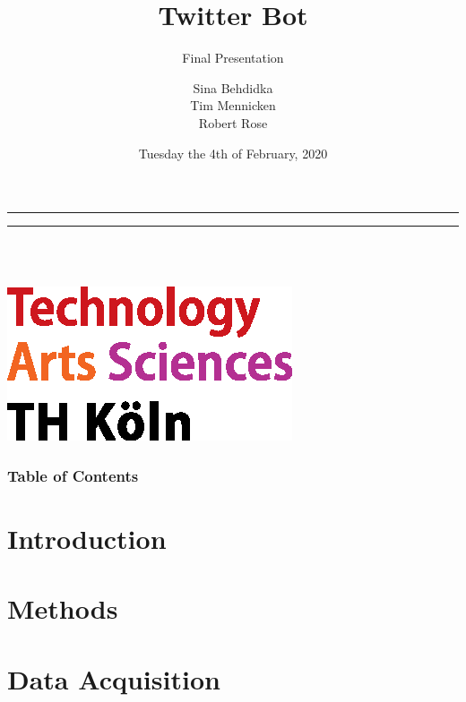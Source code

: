 \documentclass{beamer}
\title{Twitter Bot}
\subtitle{Final Presentation}
\author[Sina Behdidka, Tim Mennicken, Robert Rose]{Sina Behdidka\\ Tim Mennicken\\ Robert Rose }
\institute[TH Köln]{University of Applied Sciences Cologne}
\date[04.02.2020] %
{Tuesday the 4th of February, 2020}
\begin{document}
\bgroup
\makeatletter
{}
{
	\leavevmode
    \begin{beamercolorbox}[wd=0.125\paperwidth,dp=1pt]{}
    \end{beamercolorbox}%
    \begin{beamercolorbox}[wd=0.875\paperwidth,dp=0ex]{}
    \hrule
    \vspace{0.1mm}
    \hrule
    \vspace{1mm}
    \parbox[b]{0.3\paperwidth}{\inserttitle\\[1.5mm] \insertshortauthor\\ \insertshortdate}
    \hfill
    \includegraphics[width=0.12\paperwidth]{sources/logo_TH-Koeln_CMYK_22pt}
    \hspace{2mm}
    \vspace{1mm}
    \end{beamercolorbox}%
}
\makeatother
\begin{frame}
\titlepage
\end{frame}
\egroup

\setcounter{framenumber}{0}

\begin{frame}
\frametitle{Table of Contents}
\tableofcontents
\end{frame} 
 
\section{Introduction}

\section{Methods}

\section{Data Acquisition}
\end{document}
